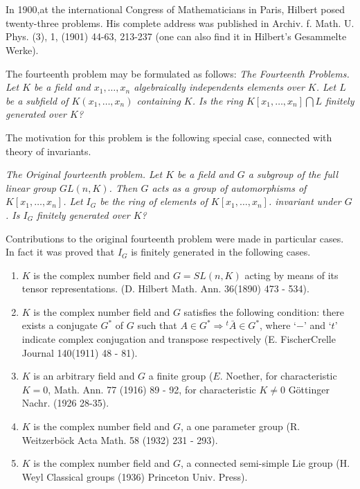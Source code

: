 \setcounter{chapter}{-1}
\chapter{}\label{chap0}

In 1900,\pageoriginale at the international Congress of
Mathematicians in Paris,\break 
Hilbert posed twenty-three problems. His complete address was
published in Archiv. f. Math. U. Phys. (3), 1, (1901) 44-63, 213-237 (one can
also find it in  Hilbert's Gesammelte Werke). 

The fourteenth problem may be formulated as follows:
\noindent
\textit{The Fourteenth Problems. Let $K$ be a field
and  $x_{1}, \ldots , x_{n}$ algebraically independents
elements over $K$. Let  $L$ be  a subfield of 
$K(x_1, \ldots , x_n)$ containing $K$. Is the ring
$K[x_1,\ldots,x_n ]\bigcap L$ finitely generated
over $K$?} 

The motivation for this problem  is the following special case,
connected  with theory of invariants. 

\noindent
\textit{The  Original fourteenth  problem. Let
$K$ be a field and $G$ a subgroup of the  full linear
group  $GL(n,K)$. Then $G$ acts as a group of
automorphisms of $K[x_1,\ldots,x_n]$. Let  $I_G$ be
the  ring  of elements of $K[x_1, \ldots,x_n]$. invariant
under $G$. Is $I_G$ finitely generated over $K$?} 

Contributions  to the original fourteenth  problem were made  in
particular cases. In fact it was  proved that $I_G$ is finitely
generated in the following cases. 
\begin{enumerate}
\item $K$ is the complex number  field  and $G=SL(n,K)$ acting  by
means  of its tensor representations. (D. Hilbert Math. Ann. 36(1890)
473 - 534). 

\item $K$ is the complex number  field and $G$  satisfies the
following condition: there  exists  a conjugate $G^{\ast}$ of $G$ such
that  $A \in G^{\ast}  \Rightarrow {}^t\bar{A}\in G^\ast$, where
`$-$' and `$t$' indicate complex conjugation and transpose respectively
(E. Fischer\pageoriginale Crelle Journal 140(1911) 48 - 81). 

\item $K$ is an arbitrary field and $G$ a finite  group ($E$. Noether,
for characteristic $K=0$, Math. Ann. 77 (1916) 89 - 92, for
characteristic $K \neq 0$ G\"ottinger Nachr. (1926 28-35).  

\item $K$ is the complex number  field and $G$,  a one parameter group
(R. Weitzerb\"ock Acta Math. 58 (1932) 231 - 293). 

\item $K$ is  the  complex number  field  and $G$,  a connected
semi-simple  Lie  group (H. Weyl  Classical groups (1936) Princeton
Univ. Press). 
\end{enumerate}

